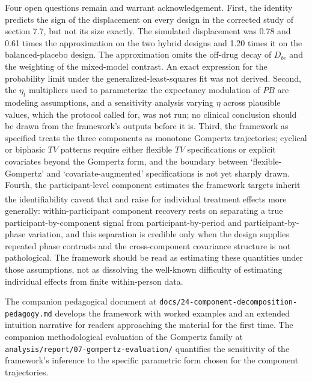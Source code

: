 \documentclass[
  11pt,
]{article}
\begin{document}
Four open questions remain and warrant acknowledgement. First, the
identity predicts the sign of the displacement on every design in the
corrected study of section 7.7, but not its size exactly. The simulated
displacement was 0.78 and 0.61 times
the approximation on the two hybrid designs and 1.20
times it on the balanced-placebo design. The approximation omits the
off-drug decay of \(D_{bc}\) and the weighting of the mixed-model contrast.
An exact expression for the probability limit under the
generalized-least-squares fit was not derived. Second, the \(\eta_t\) multipliers used to parameterize the expectancy
modulation of \(PB\) are modeling assumptions, and a sensitivity analysis
varying \(\eta\) across plausible values, which the protocol called for, was
not run; no clinical conclusion should be drawn from the framework's
outputs before it is. Third, the framework as specified treats the three
components as monotone Gompertz trajectories; cyclical or biphasic \(TV\)
patterns require either flexible \(TV\) specifications or explicit
covariates beyond the Gompertz form, and the boundary between
`flexible-Gompertz' and `covariate-augmented' specifications is not yet
sharply drawn. Fourth, the participant-level component estimates the
framework targets inherit the identifiability caveat that\textsuperscript{} and\textsuperscript{} raise for individual treatment effects more generally:
within-participant component recovery rests on separating a true
participant-by-component signal from participant-by-period and
participant-by-phase variation, and this separation is credible only when
the design supplies repeated phase contrasts and the cross-component
covariance structure is not pathological. The framework should be read as
estimating these quantities under those assumptions, not as dissolving the
well-known difficulty of estimating individual effects from finite
within-person data.

The companion pedagogical document at
\texttt{docs/24-component-decomposition-pedagogy.md} develops the framework
with worked examples and an extended intuition narrative for readers
approaching the material for the first time. The companion methodological
evaluation of the Gompertz family at
\texttt{analysis/report/07-gompertz-evaluation/} quantifies the sensitivity of
the framework's inference to the specific parametric form chosen for the
component trajectories.
\end{document}
